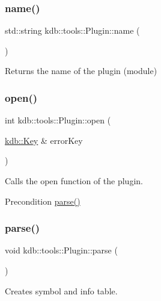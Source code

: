 \subsubsection{\texorpdfstring{name()}{name()}}
{\footnotesize\ttfamily std\+::string kdb\+::tools\+::\+Plugin\+::name (\begin{DoxyParamCaption}{ }\end{DoxyParamCaption})}

\begin{DoxyReturn}{Returns}
the name of the plugin (module) 
\end{DoxyReturn}
\mbox{\label{classkdb_1_1tools_1_1Plugin_a680a490123b5290441d76ef2c1e3f1fa}} 
\subsubsection{\texorpdfstring{open()}{open()}}
{\footnotesize\ttfamily int kdb\+::tools\+::\+Plugin\+::open (\begin{DoxyParamCaption}\item[{\hyperlink{classkdb_1_1Key}{kdb\+::\+Key} \&}]{error\+Key }\end{DoxyParamCaption})}



Calls the open function of the plugin. 

\begin{DoxyPrecond}{Precondition}
\hyperlink{classkdb_1_1tools_1_1Plugin_adfcba2fbdeb436a1083410df804d5fb0}{parse()} 
\end{DoxyPrecond}
\mbox{\label{classkdb_1_1tools_1_1Plugin_adfcba2fbdeb436a1083410df804d5fb0}} 
\subsubsection{\texorpdfstring{parse()}{parse()}}
{\footnotesize\ttfamily void kdb\+::tools\+::\+Plugin\+::parse (\begin{DoxyParamCaption}{ }\end{DoxyParamCaption})}



Creates symbol and info table. 

